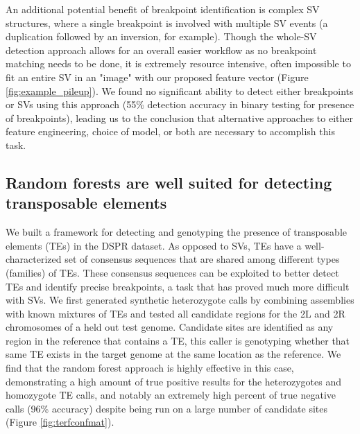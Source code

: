 An additional potential benefit of breakpoint identification is complex SV structures, where a single breakpoint is involved with multiple SV events (a duplication followed by an inversion, for example). Though the whole-SV detection approach allows for an overall easier workflow as no breakpoint matching needs to be done, it is extremely resource intensive, often impossible to fit an entire SV in an "image" with our proposed feature vector (Figure \ref{fig:example_pileup}). We found no significant ability to detect either breakpoints or SVs using this approach (55\% detection accuracy in binary testing for presence of breakpoints), leading us to the conclusion that alternative approaches to either feature engineering, choice of model, or both are necessary to accomplish this task. 

\subsection{Random forests are well suited for detecting transposable elements}

We built a framework for detecting and genotyping the presence of transposable elements (TEs) in the DSPR dataset. As opposed to SVs, TEs have a well-characterized set of consensus sequences that are shared among different types (families) of TEs. These consensus sequences can be exploited to better detect TEs and identify precise breakpoints, a task that has proved much more difficult with SVs. We first generated synthetic heterozygote calls by combining assemblies with known mixtures of TEs and tested all candidate regions for the 2L and 2R chromosomes of a held out test genome. Candidate sites are identified as any region in the reference that contains a TE, this caller is genotyping whether that same TE exists in the target genome at the same location as the reference. We find that the random forest approach is highly effective in this case, demonstrating a high amount of true positive results for the heterozygotes and homozygote TE calls, and notably an extremely high percent of true negative calls (96\% accuracy) despite being run on a large number of candidate sites (Figure \ref{fig:terfconfmat}).

